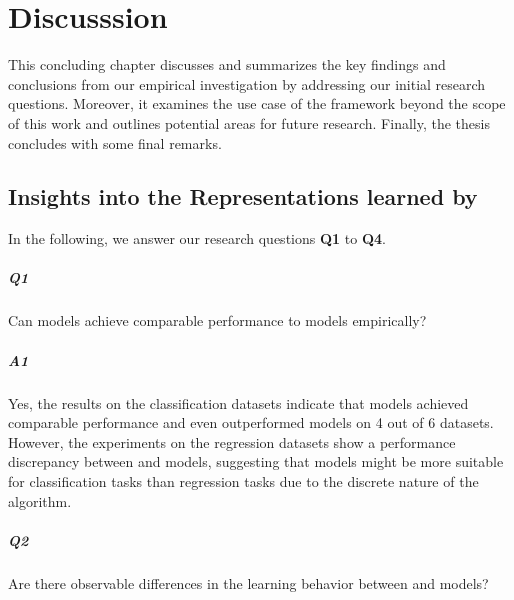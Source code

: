 \cleardoubleoddstandardpage
\chapter{Discusssion}\label{sec:discussion}
This concluding chapter discusses and summarizes the key findings and conclusions from our empirical investigation by addressing our initial research questions. Moreover, it examines the use case of the \wlnn framework beyond the scope of this work and outlines potential areas for future research. Finally, the thesis concludes with some final remarks.

\section{Insights into the Representations learned by \gnns}
In the following, we answer our research questions \textbf {Q1} to \textbf{Q4}.



\paragraph{Q1} Can \wlnn models achieve comparable performance to \gnn models empirically?

\vspace{-15pt}

\paragraph{A1} Yes, the results on the classification datasets indicate that \wlnn models achieved comparable performance and even outperformed \gnn models on 4 out of 6 datasets. However, the experiments on the regression datasets show a performance discrepancy between \gnn and \wlnn models, suggesting that \wlnn models might be more suitable for classification tasks than regression tasks due to the discrete nature of the \wl algorithm.\bigskip

\paragraph{Q2} Are there observable differences in the learning behavior between \wlnn and \gnn models?

\vspace{-15pt}


